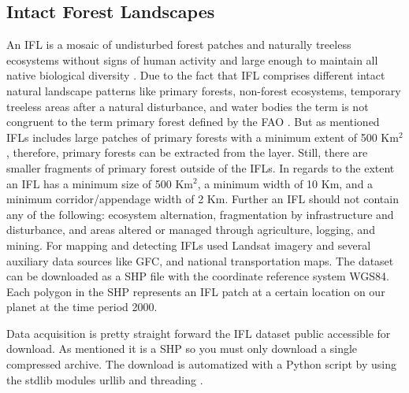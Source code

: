 	\subsection{Intact Forest Landscapes}
		An \ac{IFL} is a mosaic of undisturbed forest patches and naturally treeless ecosystems without signs of human activity and large enough to maintain all native biological diversity \citep{Potapov2017}. Due to the fact that \ac{IFL} comprises different intact natural landscape patterns like primary forests, non-forest ecosystems, temporary treeless areas after a natural disturbance, and water bodies the term is not congruent to the term primary forest defined by the \ac{FAO} \citep{FAO2012}. But as mentioned \ac{IFL}s includes large patches of primary forests with a minimum extent of 500 Km$^2$, therefore, primary forests can be extracted from the layer. Still, there are smaller fragments of primary forest outside of the \ac{IFL}s. In regards to the extent an \ac{IFL} has a minimum size of 500 Km$^2$, a minimum width of 10 Km, and a minimum corridor/appendage width of 2 Km. Further an \ac{IFL} should not contain any of the following: ecosystem alternation, fragmentation by infrastructure and disturbance, and areas altered or managed through agriculture, logging, and mining. For mapping and detecting \ac{IFL}s \citeauthor{Potapov2017} used Landsat imagery and several auxiliary data sources like \ac{GFC}, and national transportation maps. The dataset can be downloaded as a \ac{SHP} file with the coordinate reference system \ac{WGS84}. Each polygon in the \ac{SHP} represents an \ac{IFL} patch at a certain location on our planet at the time period 2000.

		Data acquisition is pretty straight forward the \ac{IFL} dataset public accessible for download. As mentioned it is a \ac{SHP} so you must only download a single compressed archive. The download is automatized with a Python script by using the \ac{stdlib} modules urllib and threading \citep{Rossum2018}.

